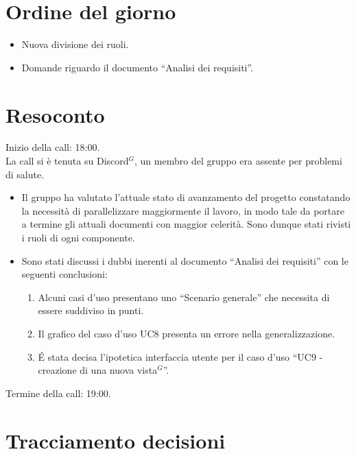 \section{Ordine del giorno}

\begin{itemize}
	\item Nuova divisione dei ruoli.
	\item Domande riguardo il documento ``Analisi dei requisiti''.
\end{itemize}

\section{Resoconto}
\label{sec:Resoconto}

\noindent 
Inizio della call: 18:00. \\
\noindent La call si è tenuta su Discord$^{G}$, un membro del gruppo era assente per problemi di salute.
\begin{itemize}
	\item Il gruppo ha valutato l'attuale stato di avanzamento del progetto constatando la necessità di parallelizzare maggiormente il lavoro, in modo tale da portare a termine gli attuali documenti con maggior celerità. Sono dunque stati rivisti i ruoli di ogni componente.
	\item Sono stati discussi i dubbi inerenti al documento ``Analisi dei requisiti'' con le seguenti conclusioni:
		\begin{enumerate}
			\item Alcuni casi d'uso presentano uno ``Scenario generale'' che necessita di essere suddiviso in punti.
			\item Il grafico del caso d'uso UC8 presenta un errore nella generalizzazione.
			\item \' E stata decisa l'ipotetica interfaccia utente per il caso d'uso ``UC9 - creazione di una nuova vista$^{G}$''.
		\end{enumerate}
\end{itemize}

\noindent Termine della call: 19:00.

\section{Tracciamento decisioni}

